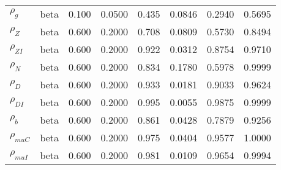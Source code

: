 \begin{center}
\begin{longtable}{llcccccc}
${\rho_g}$ & beta &   0.100 & 0.0500 &   0.435& 0.0846 &  0.2940 &  0.5695 \\ 
${\rho_Z}$ & beta &   0.600 & 0.2000 &   0.708& 0.0809 &  0.5730 &  0.8494 \\ 
${\rho_{ZI}}$ & beta &   0.600 & 0.2000 &   0.922& 0.0312 &  0.8754 &  0.9710 \\ 
${\rho_N}$ & beta &   0.600 & 0.2000 &   0.834& 0.1780 &  0.5978 &  0.9999 \\ 
${\rho_D}$ & beta &   0.600 & 0.2000 &   0.933& 0.0181 &  0.9033 &  0.9624 \\ 
${\rho_{DI}}$ & beta &   0.600 & 0.2000 &   0.995& 0.0055 &  0.9875 &  0.9999 \\ 
${\rho_b}$ & beta &   0.600 & 0.2000 &   0.861& 0.0428 &  0.7879 &  0.9256 \\ 
${\rho_{muC}}$ & beta &   0.600 & 0.2000 &   0.975& 0.0404 &  0.9577 &  1.0000 \\ 
${\rho_{muI}}$ & beta &   0.600 & 0.2000 &   0.981& 0.0109 &  0.9654 &  0.9994 \\ 
\end{longtable}
 \end{center}

